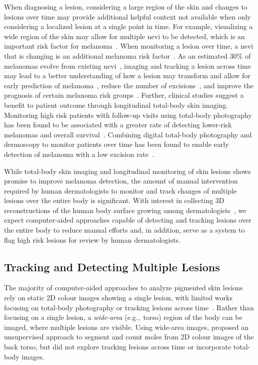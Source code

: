 \documentclass[journal]{IEEEtran}
\def\eg{e.g.,~}
\begin{document}
When diagnosing a lesion, considering a large region of the skin and changes to lesions over time may provide additional helpful context not available when only considering a localized lesion at a single point in time. For example, visualizing a wide region of the skin may allow for multiple nevi to be detected, which is an important risk factor for melanoma~\citep{Gandini2005}. When monitoring a lesion over time, a nevi that is changing is an additional melanoma risk factor~\citep{Abbasi2004}. As an estimated 30\% of melanomas evolve from existing nevi~\citep{Pampena2017}, imaging and tracking a lesion across time may lead to a better understanding of how a lesion may transform and allow for early prediction of melanoma~\citep{Sondermann2019}, reduce the number of excisions~\citep{tschandl2018sequential}, and improve the prognosis of certain melanoma risk groups~\citep{haenssle2010selection}. Further, clinical studies suggest a benefit to patient outcome through longitudinal total-body skin imaging. Monitoring high risk patients with follow-up visits using total-body photography has been found to be associated with a greater rate of detecting lower-risk melanomas and overall survival~\citep{Strunck2020}. Combining digital total-body photography and dermoscopy to monitor patients over time has been found to enable early detection of melanoma with a low excision rate~\citep{Salerni2012}.

While total-body skin imaging and longitudinal monitoring of skin lesions shows promise to improve melanoma detection, the amount of manual intervention required by human dermatologists to monitor and track changes of multiple lesions over the entire body is significant. With interest in collecting 3D reconstructions of the human body surface growing among dermatologists~\citep{Rayner2018,Primiero2019}, we expect computer-aided approaches capable of detecting and tracking lesions over the entire body to reduce manual efforts and, in addition, serve as a system to flag high risk lesions for review by human dermatologists.

\subsection{Tracking and Detecting Multiple Lesions}
The majority of computer-aided approaches to analyze pigmented skin lesions rely on static 2D colour images showing a single lesion, with limited works focusing on total-body photography or tracking lesions across time~\citep{Celebi2019,Pathan2018}. 
Rather than focusing on a single lesion, a \emph{wide-area} (\eg torso) region of the body can be imaged, where multiple lesions are visible. Using wide-area images, \citet{Lee2005} proposed an unsupervised approach to segment and count moles from 2D colour images of the back torso, but did not explore tracking lesions across time or incorporate total-body images.
\end{document}
